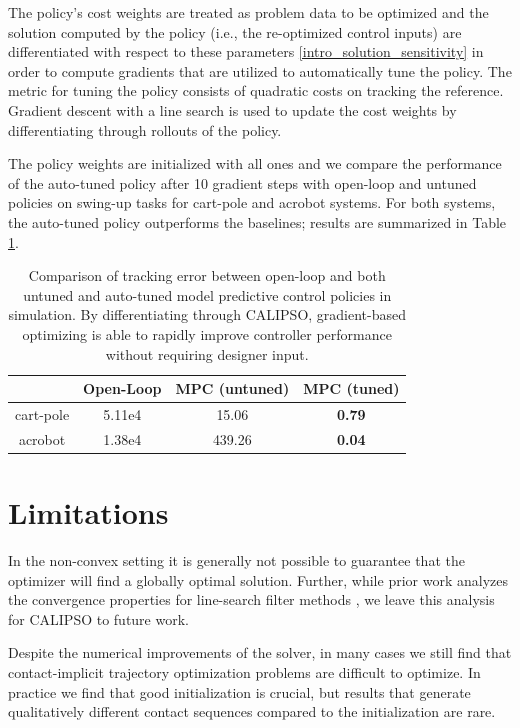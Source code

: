 The policy's cost weights are treated as problem data to be optimized and the solution computed by the policy (i.e., the re-optimized control inputs) are differentiated with respect to these parameters \eqref{intro_solution_sensitivity} in order to compute gradients that are utilized to automatically tune the policy. The metric for tuning the policy consists of quadratic costs on tracking the reference. Gradient descent with a line search is used to update the cost weights by differentiating through rollouts of the policy. 

The policy weights are initialized with all ones and we compare the performance of the auto-tuned policy after 10 gradient steps with open-loop and untuned policies on swing-up tasks for cart-pole and acrobot systems. For both systems, the auto-tuned policy outperforms the baselines; results are summarized in Table \ref{calipso_mpc_autotune}.

\begin{table}[H] 
	\centering
	\caption[Numerical results for predictive control auto-tuning]{Comparison of tracking error between open-loop and both untuned and auto-tuned model predictive control policies in simulation. By differentiating through CALIPSO, gradient-based optimizing is able to rapidly improve controller performance without requiring designer input.}
	\begin{tabular}{c c c c}
		\toprule
		&
		\textbf{Open-Loop} &
		\textbf{MPC (untuned)} &
		\textbf{MPC (tuned)} \\
		\toprule
		cart-pole & 5.11e4 & 15.06 & \textbf{0.79}\\
		acrobot & 1.38e4 & 439.26 & \textbf{0.04}\\
		\toprule
	\end{tabular}
	\label{calipso_mpc_autotune}
\end{table}

\section{Limitations} \label{calipso_limitations}
In the non-convex setting it is generally not possible to guarantee that the optimizer will find a globally optimal solution. Further, while prior work analyzes the convergence properties for line-search filter methods \cite{wachter2005line}, we leave this analysis for CALIPSO to future work. 

Despite the numerical improvements of the solver, in many cases we still find that contact-implicit trajectory optimization problems are difficult to optimize. In practice we find that good initialization is crucial, but results that generate qualitatively different contact sequences compared to the initialization are rare. 

